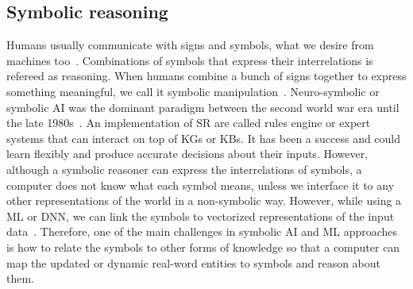 \subsection{Symbolic reasoning}
Humans usually communicate with signs and symbols, what we desire from machines too~\cite{SAI}. Combinations of symbols that express their interrelations is refereed as reasoning. When humans combine a bunch of signs together to express something meaningful, we call it symbolic manipulation~\cite{alirezaie2019semantic}. 
Neuro-symbolic or symbolic AI was the dominant paradigm between the second world war era until the late 1980s~\cite{GoFI}. An implementation of SR are called rules engine or expert systems that can interact on top of KGs or KBs. It has been a success and could learn flexibly and produce accurate decisions about their inputs. However, although a symbolic reasoner can express the interrelations of symbols, a computer does not know what each symbol means, unless we interface it to any other representations of the world in a non-symbolic way. However, while using a ML or DNN, we can link the symbols to vectorized representations of the input data~\cite{SAI,sarker2017explaining}. Therefore, one of the main challenges in symbolic AI and ML approaches is how to relate the symbols to other forms of knowledge so that a computer can map the updated or dynamic real-word entities to symbols and reason about them. 

